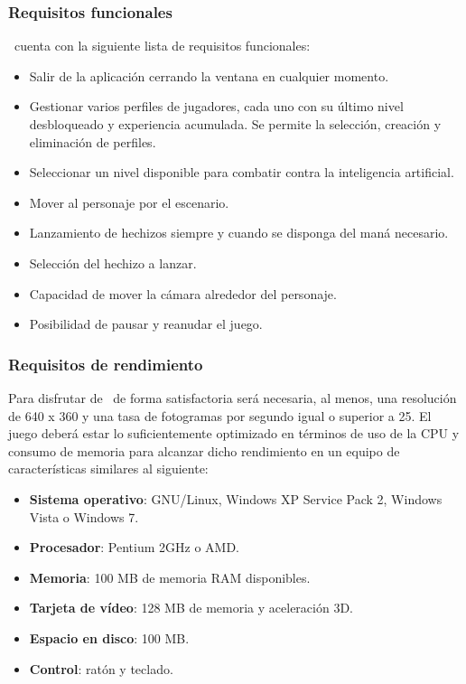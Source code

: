 
\subsubsection{Requisitos funcionales}

\juego\ cuenta con la siguiente lista de requisitos funcionales:

\begin{itemize}
    \item Salir de la aplicación cerrando la ventana en cualquier momento.
    \item Gestionar varios perfiles de jugadores, cada uno con su último
    nivel desbloqueado y experiencia acumulada. Se permite la selección,
    creación y eliminación de perfiles.
    \item Seleccionar un nivel disponible para combatir contra la inteligencia
    artificial.
    \item Mover al personaje por el escenario.
    \item Lanzamiento de hechizos siempre y cuando se disponga del maná necesario.
    \item Selección del hechizo a lanzar.
    \item Capacidad de mover la cámara alrededor del personaje.
    \item Posibilidad de pausar y reanudar el juego.
\end{itemize}

\subsubsection{Requisitos de rendimiento}

Para disfrutar de \juego\ de forma satisfactoria será necesaria, al menos,
una resolución de 640 x 360 y una tasa de fotogramas por segundo igual
o superior a 25. El juego deberá estar lo suficientemente optimizado
en términos de uso de la CPU y consumo de memoria para alcanzar dicho
rendimiento en un equipo de características similares al siguiente:

\begin{itemize}
    \itemsep0em
    \item \textbf{Sistema operativo}: GNU/Linux, Windows XP Service Pack
    2, Windows Vista o Windows 7.
    \item \textbf{Procesador}: Pentium 2GHz o AMD.
    \item \textbf{Memoria}: 100 MB de memoria RAM disponibles.
    \item \textbf{Tarjeta de vídeo}: 128 MB de memoria y aceleración 3D.
    \item \textbf{Espacio en disco}: 100 MB.
    \item \textbf{Control}: ratón y teclado.
\end{itemize}


